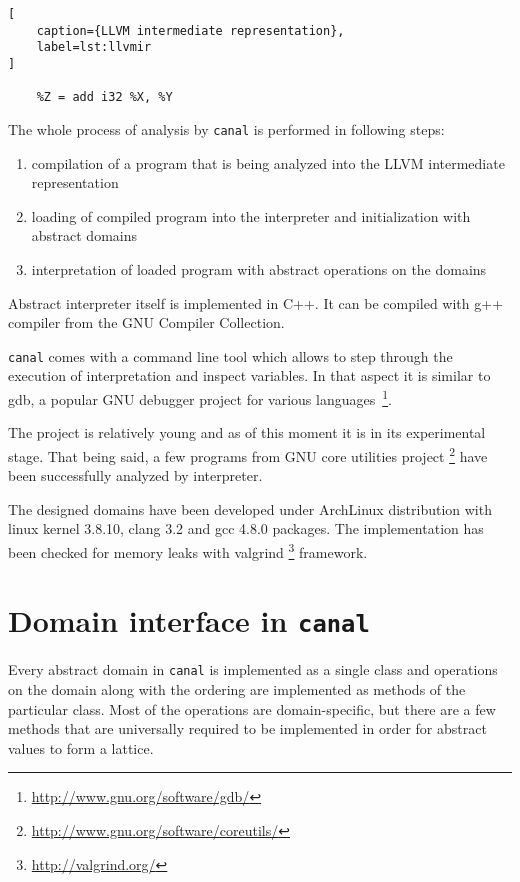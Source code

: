 \documentclass[12pt,final,oneside]{fithesis2}
\theoremstyle{definition}
\begin{document}
\begin{lstlisting}[
    caption={LLVM intermediate representation},
    label=lst:llvmir
]

    %Z = add i32 %X, %Y

\end{lstlisting}

The whole process of analysis by \texttt{canal} is performed in following
steps:

\begin{enumerate}

\item compilation of a program that is being analyzed into the LLVM
intermediate representation

\item loading of compiled program into the interpreter and initialization
with abstract domains

\item interpretation of loaded program with abstract operations on the
domains

\end{enumerate}

Abstract interpreter itself is implemented in C++. It can be compiled with
g++ compiler from the GNU Compiler Collection.

\texttt{canal} comes with a command line tool which allows to step through
the execution of interpretation and inspect variables. In that aspect it
is similar to gdb, a popular GNU debugger project for various
languages~\footnote{\url{http://www.gnu.org/software/gdb/}}.

The project is relatively young and as of this moment it is in its experimental
stage. That being said, a few programs from GNU core utilities project
\footnote{\url{http://www.gnu.org/software/coreutils/}} have been
successfully analyzed by interpreter.

The designed domains have been developed under ArchLinux distribution
with linux kernel 3.8.10, clang 3.2 and gcc 4.8.0 packages. The implementation
has been checked for memory leaks with valgrind
\footnote{\url{http://valgrind.org/}} framework.


\section{Domain interface in \texttt{canal}}

Every abstract domain in \texttt{canal} is implemented as a single class and
operations on the domain along with the ordering are implemented as methods
of the particular class. Most of the operations are domain-specific, but
there are a few methods that are universally required to be implemented in
order for abstract values to form a lattice.
\end{document}
